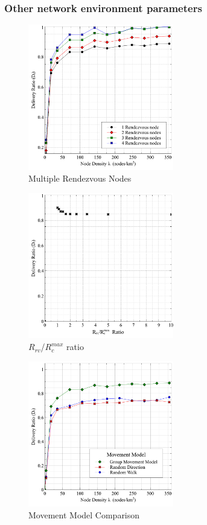 
\subsubsection{Other network environment parameters}

\begin{figure}[!t]
	\centering
	\includegraphics[width=2.5in]{Graphs/MultipleRVs.pdf}
	\caption{Multiple Rendezvous Nodes}
	\label{Multiple Rendezvous Nodes}
\end{figure}

\begin{figure}[!t]
\centering
\includegraphics[width=2.5in]{Graphs/RcmaxRrv.pdf}
\caption{$R_{rv}$/$R_c^{max}$ ratio}
\label{RrvRcmaxRatio}
\end{figure}

\begin{figure}[!t]
\centering
\includegraphics[width=2.5in]{Graphs/movement.pdf}
\caption{Movement Model Comparison}
\label{Movement Model Comparison}
\end{figure}

